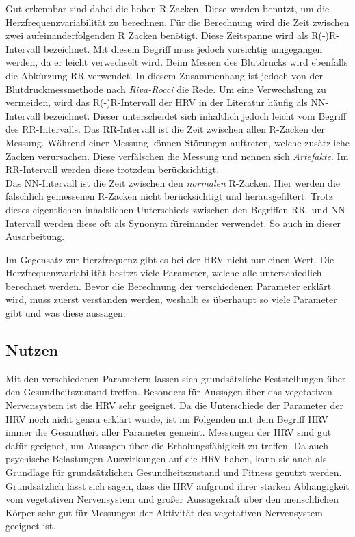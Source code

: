 Gut erkennbar sind dabei die hohen R Zacken. Diese werden benutzt, um die Herzfrequenzvariabilität zu berechnen.
Für die Berechnung wird die Zeit zwischen zwei aufeinanderfolgenden R Zacken benötigt. Diese Zeitspanne wird als R(-)R-Intervall bezeichnet. Mit diesem Begriff muss jedoch vorsichtig umgegangen werden, da er leicht verwechselt wird. Beim Messen des Blutdrucks wird ebenfalls die Abkürzung RR verwendet. In diesem Zusammenhang ist jedoch von der Blutdruckmessmethode nach \textit{Riva-Rocci} die Rede. Um eine Verwechslung zu vermeiden, wird das R(-)R-Intervall der HRV in der Literatur häufig als NN-Intervall bezeichnet. Dieser unterscheidet sich inhaltlich jedoch leicht vom Begriff des RR-Intervalls. 
Das RR-Intervall ist die Zeit zwischen allen R-Zacken der Messung. Während einer Messung können Störungen auftreten, welche zusätzliche \glqq Zacken\grqq{} verursachen. Diese verfälschen die Messung und nennen sich \textit{Artefakte}\cite{artefakt}. Im RR-Intervall werden diese trotzdem berücksichtigt.\\
Das NN-Intervall ist die Zeit zwischen den \textit{normalen} R-Zacken. Hier werden die fälschlich gemessenen R-Zacken nicht berücksichtigt und herausgefiltert. Trotz dieses eigentlichen inhaltlichen Unterschieds zwischen den Begriffen RR- und NN-Intervall werden diese oft als Synonym füreinander verwendet. So auch in dieser Ausarbeitung.\cite{rr}\cite{kubios}


Im Gegensatz zur Herzfrequenz gibt es bei der HRV nicht nur einen Wert. Die Herzfrequenzvariabilität besitzt viele Parameter, welche alle unterschiedlich berechnet werden. Bevor die Berechnung der verschiedenen Parameter erklärt wird, muss zuerst verstanden werden, weshalb es überhaupt so viele Parameter gibt und was diese aussagen.

\subsection{Nutzen}
Mit den verschiedenen Parametern lassen sich grundsätzliche Feststellungen über den Gesundheitszustand treffen. Besonders für Aussagen über das vegetativen Nervensystem ist die HRV sehr geeignet. Da die Unterschiede der Parameter der HRV noch nicht genau erklärt wurde, ist im Folgenden mit dem Begriff HRV immer die Gesamtheit aller Parameter gemeint. Messungen der HRV sind gut dafür geeignet, um Aussagen über die Erholungsfähigkeit zu treffen. Da auch psychische Belastungen Auswirkungen auf die HRV haben, kann sie auch als Grundlage für grundsätzlichen Gesundheitszustand und Fitness genutzt werden. \\
Grundsätzlich lässt sich sagen, dass die HRV aufgrund ihrer starken Abhängigkeit vom vegetativen Nervensystem und großer Aussagekraft über den menschlichen Körper sehr gut für Messungen der Aktivität des vegetativen Nervensystem geeignet ist. 
 

